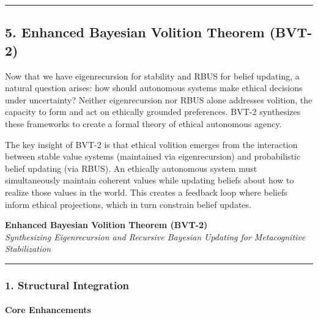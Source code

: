 \documentclass[
]{article}
\begin{document}
\begin{center}\rule{0.5\linewidth}{0.5pt}\end{center}

\subsection{5. Enhanced Bayesian Volition Theorem
(BVT-2)}\label{5-enhanced-bayesian-volition-theorem}

Now that we have eigenrecursion for stability and RBUS for belief
updating, a natural question arises: how should autonomous systems make
ethical decisions under uncertainty? Neither eigenrecursion nor RBUS
alone addresses volition, the capacity to form and act on ethically
grounded preferences. BVT-2 synthesizes these frameworks to create a
formal theory of ethical autonomous agency.

The key insight of BVT-2 is that ethical volition emerges from the
interaction between stable value systems (maintained via eigenrecursion)
and probabilistic belief updating (via RBUS). An ethically autonomous
system must simultaneously maintain coherent values while updating
beliefs about how to realize those values in the world. This creates a
feedback loop where beliefs inform ethical projections, which in turn
constrain belief updates.

\textbf{Enhanced Bayesian Volition Theorem (BVT-2)}\\
\emph{Synthesizing Eigenrecursion and Recursive Bayesian Updating for
Metacognitive Stabilization}

\begin{center}\rule{0.5\linewidth}{0.5pt}\end{center}

\subsubsection{\texorpdfstring{\textbf{1. Structural
Integration}}{1. Structural Integration}}\label{structural-integration}

\paragraph{\texorpdfstring{\textbf{Core
Enhancements}}{Core Enhancements}}\label{core-enhancements}
\end{document}
